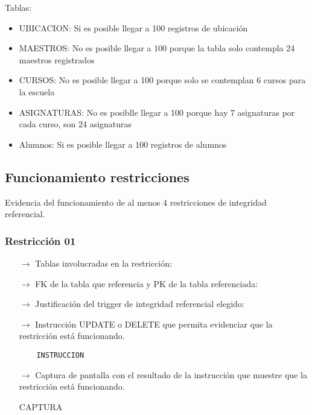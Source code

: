 Tablas:
\begin{itemize}
  \item UBICACION: Si es posible llegar a 100 registros de ubicación 
  \item MAESTROS: No es posible llegar a 100 porque la tabla solo contempla 24 maestros registrados
  \item CURSOS: No es posible llegar a 100 porque solo se contemplan 6 cursos para la escuela
  \item ASIGNATURAS: No es posiblle llegar a 100 porque hay 7 asignaturas por cada curso, son 24 asignaturas
  \item Alumnos: Si es posible llegar a 100 registros de alumnos
\end{itemize}

\subsection{Funcionamiento restricciones}

Evidencia del funcionamiento de al menos 4 restricciones de integridad referencial.

\subsubsection*{Restricción 01}

\begin{itemize}
    \item[$\rightarrow$] Tablas involucradas en la restricción: 
    \item[$\rightarrow$] FK de la tabla que referencia y PK de la tabla referenciada: 
    \item[$\rightarrow$] Justificación del trigger de integridad referencial elegido: 
    \item[$\rightarrow$] Instrucción UPDATE o DELETE que permita evidenciar que la restricción está
    funcionando.
    \begin{verbatim}
    INSTRUCCION
    \end{verbatim}
    \item[$\rightarrow$] Captura de pantalla con el resultado de la instrucción que muestre que la restricción está
    funcionando.
    \begin{center}
        CAPTURA
    \end{center}
\end{itemize}

